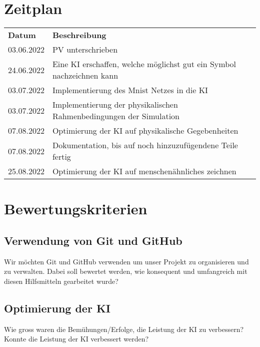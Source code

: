 \documentclass{article}
\begin{document}
\section{Zeitplan}
\label{chap:zeitplan}
\begin{table}[H]
    \begin{tabular}{ll}
    \textbf{Datum} & \textbf{Beschreibung}                                                                         \\
    03.06.2022     & PV unterschrieben                                                                             \\
    24.06.2022     & Eine KI erschaffen, welche möglichst gut ein Symbol nachzeichnen kann                         \\
    03.07.2022     & Implementierung des Mnist Netzes in die KI                                                    \\
    03.07.2022     & Implementierung der physikalischen Rahmenbedingungen der Simulation                           \\
    07.08.2022     & Optimierung der KI auf physikalische Gegebenheiten                                            \\
    07.08.2022     & Dokumentation, bis auf noch hinzuzufügendene Teile fertig                                     \\
    25.08.2022     & Optimierung der KI auf menschenähnliches zeichnen                                             \\
    \end{tabular}
\end{table}

\section{Bewertungskriterien}
\subsection{Verwendung von Git und GitHub}
\label{chap:git_github}
Wir möchten Git und GitHub verwenden um unser Projekt zu organisieren und zu verwalten. 
Dabei soll bewertet werden, wie konsequent und umfangreich mit diesen Hilfsmitteln gearbeitet wurde?

\subsection{Optimierung der KI}
\label{chap:optimierung}
Wie gross waren die Bemühungen/Erfolge, die Leistung der KI zu verbessern?
Konnte die Leistung der KI verbessert werden?
\end{document}
